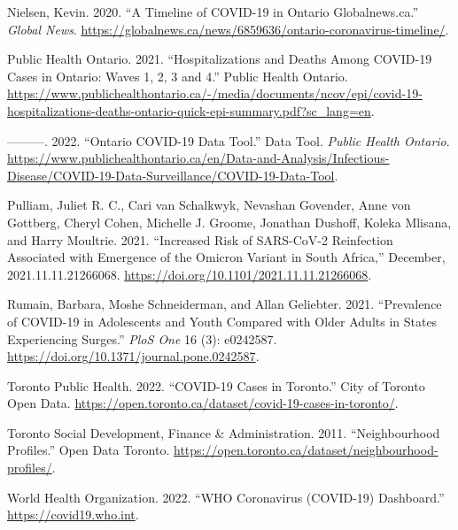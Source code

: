 \documentclass[]{article}
\newenvironment{CSLReferences}%
  {}%
  {\par}
\begin{document}
\begin{CSLReferences}{1}{0}
\leavevmode{}%
Nielsen, Kevin. 2020. {``A Timeline of COVID-19 in Ontario \textbar{}
Globalnews.ca.''} \emph{Global News}.
\url{https://globalnews.ca/news/6859636/ontario-coronavirus-timeline/}.

\leavevmode{}%
Public Health Ontario. 2021. {``Hospitalizations and Deaths Among
COVID-19 Cases in Ontario: Waves 1, 2, 3 and 4.''} Public Health
Ontario.
\url{https://www.publichealthontario.ca/-/media/documents/ncov/epi/covid-19-hospitalizations-deaths-ontario-quick-epi-summary.pdf?sc_lang=en}.

\leavevmode{}%
---------. 2022. {``Ontario COVID-19 Data Tool.''} Data Tool.
\emph{Public Health Ontario}.
\url{https://www.publichealthontario.ca/en/Data-and-Analysis/Infectious-Disease/COVID-19-Data-Surveillance/COVID-19-Data-Tool}.

\leavevmode{}%
Pulliam, Juliet R. C., Cari van Schalkwyk, Nevashan Govender, Anne von
Gottberg, Cheryl Cohen, Michelle J. Groome, Jonathan Dushoff, Koleka
Mlisana, and Harry Moultrie. 2021. {``Increased Risk of SARS-CoV-2
Reinfection Associated with Emergence of the Omicron Variant in South
Africa,''} December, 2021.11.11.21266068.
\url{https://doi.org/10.1101/2021.11.11.21266068}.

\leavevmode{}%
Rumain, Barbara, Moshe Schneiderman, and Allan Geliebter. 2021.
{``Prevalence of COVID-19 in Adolescents and Youth Compared with Older
Adults in States Experiencing Surges.''} \emph{PloS One} 16 (3):
e0242587. \url{https://doi.org/10.1371/journal.pone.0242587}.

\leavevmode{}%
Toronto Public Health. 2022. {``COVID-19 Cases in Toronto.''} City of
Toronto Open Data.
\url{https://open.toronto.ca/dataset/covid-19-cases-in-toronto/}.

\leavevmode{}%
Toronto Social Development, Finance \& Administration. 2011.
{``Neighbourhood Profiles.''} Open Data Toronto.
\url{https://open.toronto.ca/dataset/neighbourhood-profiles/}.

\leavevmode{}%
World Health Organization. 2022. {``WHO Coronavirus (COVID-19)
Dashboard.''} \url{https://covid19.who.int}.

\end{CSLReferences}





\newpage
\singlespacing 
\end{document}
